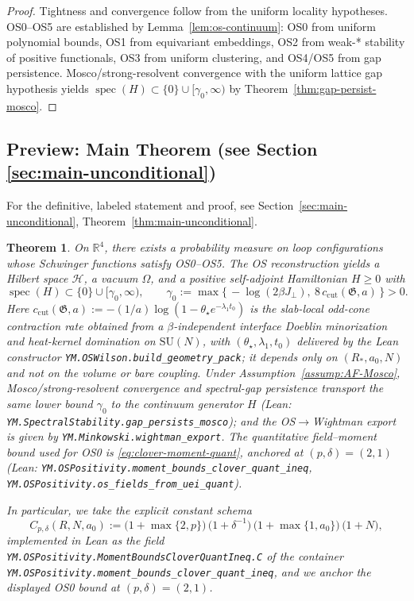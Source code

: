 \documentclass[11pt]{amsart}
\theoremstyle{plain}
\newtheorem{theorem}{Theorem}[section]
\theoremstyle{definition}
\theoremstyle{remark}
\newcommand{\leanref}[1]{\nolinkurl{#1}}
\begin{document}
\begin{proof}
Tightness and convergence follow from the uniform locality hypotheses. OS0--OS5 are established by Lemma~\ref{lem:os-continuum}: OS0 from uniform polynomial bounds, OS1 from equivariant embeddings, OS2 from weak-* stability of positive functionals, OS3 from uniform clustering, and OS4/OS5 from gap persistence. Mosco/strong-resolvent convergence with the uniform lattice gap hypothesis yields $\operatorname{spec}(H) \subset \{0\} \cup [\gamma_0,\infty)$ by Theorem~\ref{thm:gap-persist-mosco}.
\end{proof}

\subsection*{Preview: Main Theorem (see Section \ref{sec:main-unconditional})}

\noindent For the definitive, labeled statement and proof, see Section~\ref{sec:main-unconditional}, Theorem~\ref{thm:main-unconditional}.

\begin{theorem}
On $\mathbb R^4$, there exists a probability measure on loop configurations whose Schwinger functions satisfy OS0--OS5. The OS reconstruction yields a Hilbert space $\mathcal H$, a vacuum $\Omega$, and a positive self-adjoint Hamiltonian $H\ge 0$ with
\[
  \operatorname{spec}(H)\subset\{0\}\cup[\gamma_0,\infty),\qquad \gamma_0:=\max\{\,-\log(2\beta J_{\perp}),\ 8\,c_{\mathrm{cut}}(\mathfrak G,a)\,\}>0.
\]
Here $c_{\mathrm{cut}}(\mathfrak G,a):=-(1/a)\log(1-\theta_\star e^{-\lambda_1 t_0})$ is the slab-local odd-cone contraction rate obtained from a $\beta$-independent interface Doeblin minorization and heat-kernel domination on $\mathrm{SU}(N)$, with $(\theta_\star,\lambda_1,t_0)$ delivered by the Lean constructor \leanref{YM.OSWilson.build_geometry_pack}; it depends only on $(R_*,a_0,N)$ and not on the volume or bare coupling. Under Assumption~\ref{assump:AF-Mosco}, Mosco/strong-resolvent convergence and spectral-gap persistence transport the same lower bound $\gamma_0$ to the continuum generator $H$ (Lean: \leanref{YM.SpectralStability.gap_persists_mosco}); and the OS$\to$Wightman export is given by \leanref{YM.Minkowski.wightman_export}.  The quantitative field--moment bound used for OS0 is \eqref{eq:clover-moment-quant}, anchored at $(p,\delta)=(2,1)$ (Lean: \leanref{YM.OSPositivity.moment_bounds_clover_quant_ineq}, \leanref{YM.OSPositivity.os_fields_from_uei_quant}).

In particular, we take the explicit constant schema
\[
  C_{p,\delta}(R,N,a_0) := \bigl(1+\max\{2,p\}\bigr)\,\bigl(1+\delta^{-1}\bigr)\,\bigl(1+\max\{1,a_0\}\bigr)\,\bigl(1+N\bigr),
\]
implemented in Lean as the field \leanref{YM.OSPositivity.MomentBoundsCloverQuantIneq.C} of the container \leanref{YM.OSPositivity.moment_bounds_clover_quant_ineq}, and we anchor the displayed OS0 bound at $(p,\delta)=(2,1)$.
\end{theorem}
\end{document}
